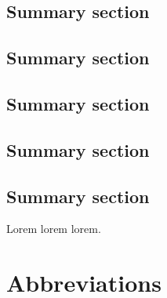 \documentclass[english,master,unicode]{ctufit-thesis}
\theoremstyle{plain}
\theoremstyle{definition}
\theoremstyle{remark}
\numberwithin{theorem}{chapter}
\begin{document}
\begin{summarypage}
\section*{Summary section}

\lipsum[1][1-8]

\section*{Summary section}

\lipsum[2][1-6]

\section*{Summary section}

\lipsum[3]

\section*{Summary section}

\lipsum[2]

\section*{Summary section}

\lipsum[1][1-8] Lorem lorem lorem.
\end{summarypage}

\chapter{Abbreviations}

\printglossaries

\mainmatter\mainmatterinit %



\appendix\appendixinit %


\backmatter %

\printbibliography %

\end{document}
